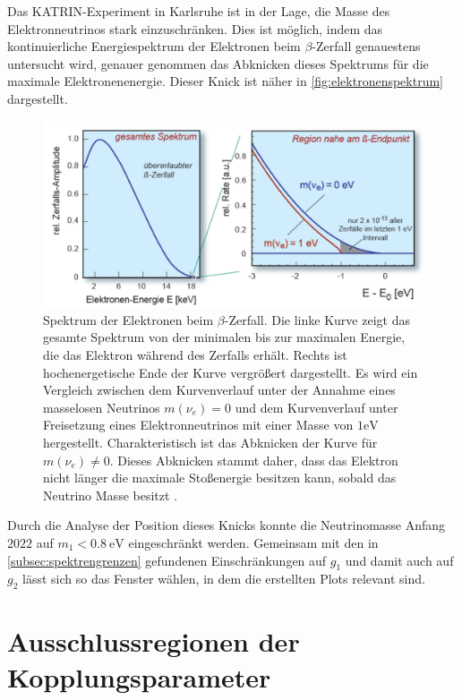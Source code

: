 Das KATRIN-Experiment in Karlsruhe ist in der Lage, die Masse des Elektronneutrinos stark einzuschränken.
Dies ist möglich, indem das kontinuierliche Energiespektrum der Elektronen beim $\beta$-Zerfall genauestens untersucht wird, genauer genommen das Abknicken dieses Spektrums für die maximale Elektronenenergie.
Dieser Knick ist näher in \autoref{fig:elektronenspektrum} dargestellt.
\begin{figure}[H]
    \centering
    \includegraphics[width=.5\textwidth]{figures/Elektronenspektrum.pdf}
    \caption{Spektrum der Elektronen beim $\beta$-Zerfall. Die linke Kurve zeigt das gesamte Spektrum von der minimalen bis zur maximalen Energie, die das Elektron während des Zerfalls erhält. Rechts
            ist hochenergetische Ende der Kurve vergrößert dargestellt. Es wird ein Vergleich zwischen dem Kurvenverlauf unter der Annahme eines masselosen Neutrinos $m(\nu_e) = 0$ und dem Kurvenverlauf unter Freisetzung
            eines Elektronneutrinos mit einer Masse von $1 \si{\eV}$ hergestellt. Charakteristisch ist das Abknicken der Kurve für $m(\nu_e) \neq 0$. Dieses Abknicken stammt daher, dass das Elektron nicht länger
            die maximale Stoßenergie besitzen kann, sobald das Neutrino Masse besitzt \cite{elektronenspektrum}.}
    \label{fig:elektronenspektrum}
\end{figure}
Durch die Analyse der Position dieses Knicks konnte die Neutrinomasse Anfang $2022$ auf $m_1 < \SI{0.8}{\eV}$ \cite{KATRINneutrinogrenze} eingeschränkt werden.
Gemeinsam mit den in \autoref{subsec:spektrengrenzen} gefundenen Einschränkungen auf $g_1$ und damit auch auf $g_2$ lässt sich so das Fenster wählen, in dem die erstellten Plots relevant sind.



\section{Ausschlussregionen der Kopplungsparameter}
\label{sec:kopplungen}

